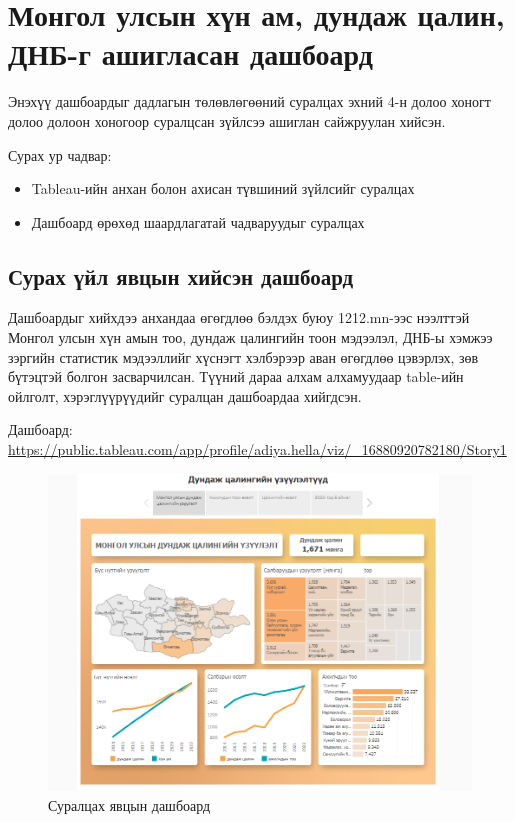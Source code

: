 \section{Монгол улсын хүн ам, дундаж цалин, ДНБ-г ашигласан дашбоард}

Энэхүү дашбоардыг дадлагын төлөвлөгөөний суралцах эхний 4-н долоо хоногт долоо долоон хоногоор суралцсан зүйлсээ ашиглан сайжруулан хийсэн.

Сурах ур чадвар: 
\begin{itemize}
    \item Tableau-ийн анхан болон ахисан түвшиний зүйлсийг суралцах
    \item Дашбоард өрөхөд шаардлагатай чадваруудыг суралцах
\end{itemize}

\subsection{Сурах үйл явцын хийсэн дашбоард}

Дашбоардыг хийхдээ анхандаа өгөгдлөө бэлдэх буюу 1212.mn-ээс нээлттэй Монгол улсын хүн амын тоо, дундаж цалингийн тоон мэдээлэл, ДНБ-ы хэмжээ зэргийн статистик мэдээллийг хүснэгт хэлбэрээр аван өгөгдлөө цэвэрлэх, зөв бүтэцтэй болгон засварчилсан. Түүний дараа алхам алхамуудаар table-ийн ойлголт, хэрэглүүрүүдийг суралцан дашбоардаа хийгдсэн.

Дашбоард: \url{https://public.tableau.com/app/profile/adiya.hella/viz/_16880920782180/Story1}
\begin{figure}
	\centering
	\includegraphics[width=15cm]{images/dash1.PNG}
	\caption{Суралцах явцын дашбоард}
	\label{fig:form}
\end{figure}


